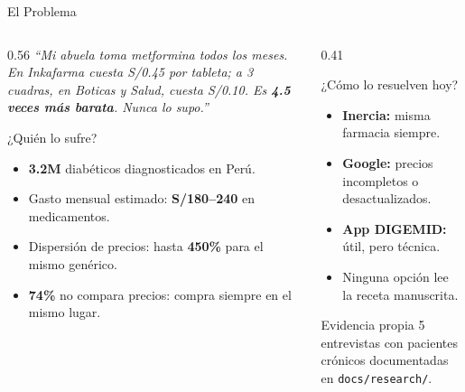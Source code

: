 \documentclass[aspectratio=169,11pt]{beamer}
\newcommand{\tightlist}{\setlength\itemsep{2pt}\setlength\parskip{0pt}\setlength\parsep{0pt}}
\begin{document}
\begin{frame}[t]{El Problema}
\vspace{-0.3em}
\begin{columns}[T,onlytextwidth]
\begin{column}{0.56\textwidth}
{\scriptsize\itshape
``Mi abuela toma metformina todos los meses. En Inkafarma cuesta S/0.45 por tableta; a 3 cuadras, en Boticas y Salud, cuesta S/0.10. Es \textbf{4.5 veces más barata}. Nunca lo supo.''}

\vspace{0.45em}
\begin{block}{¿Quién lo sufre?}
\begin{itemize}\tightlist
  \item \textbf{3.2M} diabéticos diagnosticados en Perú.
  \item Gasto mensual estimado: \textbf{S/180--240} en medicamentos.
  \item Dispersión de precios: hasta \textbf{450\%} para el mismo genérico.
  \item \textbf{74\%} no compara precios: compra siempre en el mismo lugar.
\end{itemize}
\end{block}
\end{column}
\begin{column}{0.41\textwidth}
\begin{block}{¿Cómo lo resuelven hoy?}
\begin{itemize}\tightlist
  \item \textbf{Inercia:} misma farmacia siempre.
  \item \textbf{Google:} precios incompletos o desactualizados.
  \item \textbf{App DIGEMID:} útil, pero técnica.
  \item Ninguna opción lee la receta manuscrita.
\end{itemize}
\end{block}
\vspace{0.35em}
\begin{alertblock}{Evidencia propia}
5 entrevistas con pacientes crónicos documentadas en \texttt{docs/research/}.
\end{alertblock}
\end{column}
\end{columns}
\end{frame}
\end{document}
